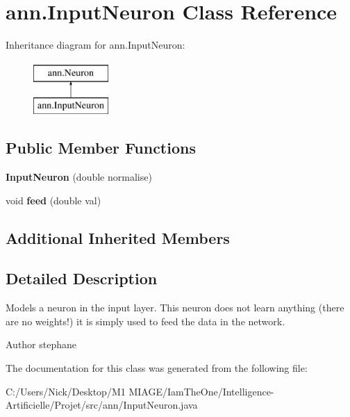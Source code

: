 \hypertarget{classann_1_1_input_neuron}{}\section{ann.\+Input\+Neuron Class Reference}
\label{classann_1_1_input_neuron}
Inheritance diagram for ann.\+Input\+Neuron\+:\begin{figure}[H]
\begin{center}
\leavevmode
\includegraphics[height=2.000000cm]{classann_1_1_input_neuron}
\end{center}
\end{figure}
\subsection*{Public Member Functions}
\begin{DoxyCompactItemize}
\item 
\mbox{\label{classann_1_1_input_neuron_aff4d145c16f3c5e6b667a739465a3866}} 
{\bfseries Input\+Neuron} (double normalise)
\item 
\mbox{\label{classann_1_1_input_neuron_a6a02b1d84db4ae32922ae59707a0c039}} 
void {\bfseries feed} (double val)
\end{DoxyCompactItemize}
\subsection*{Additional Inherited Members}


\subsection{Detailed Description}
Models a neuron in the input layer. This neuron does not learn anything (there are no weights!) it is simply used to feed the data in the network. \begin{DoxyAuthor}{Author}
stephane 
\end{DoxyAuthor}


The documentation for this class was generated from the following file\+:\begin{DoxyCompactItemize}
\item 
C\+:/\+Users/\+Nick/\+Desktop/\+M1 M\+I\+A\+G\+E/\+Iam\+The\+One/\+Intelligence-\/\+Artificielle/\+Projet/src/ann/Input\+Neuron.\+java\end{DoxyCompactItemize}
